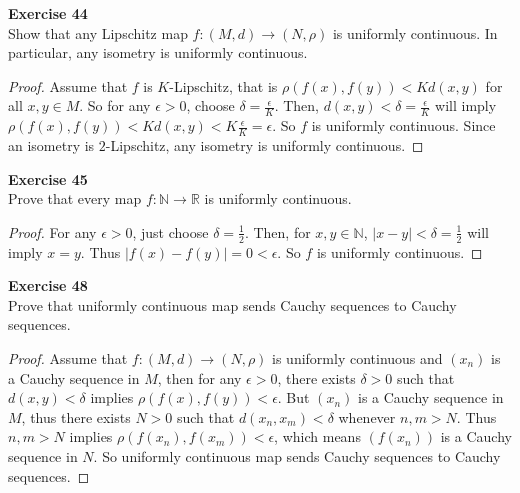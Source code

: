 \documentclass[12pt, a4paper]{article}
\theoremstyle{plain}
\newcommand{\N}{\mathbb{N}}
\newcommand{\R}{\mathbb{R}}
\newenvironment{exercise}[2][Exercise]
    { \begin{mdframed}[backgroundcolor=gray!20] \textbf{#1 #2} \\}
    {  \end{mdframed}}
\begin{document}
\begin{exercise}{44}
Show that any Lipschitz map $f:(M,d)\rightarrow (N,\rho)$ is uniformly continuous. In particular, any isometry is uniformly continuous.
\end{exercise}
	\begin{proof}
	Assume that $f$ is $K$-Lipschitz, that is $\rho(f(x),f(y))<Kd(x,y)$ for all $x,y\in M$. So for any $\epsilon>0$, choose $\delta =\frac{\epsilon}{K}$. Then, $d(x,y)<\delta = \frac{\epsilon}{K}$ will imply $\rho(f(x),f(y))<Kd(x,y)<K\frac{\epsilon}{K}=\epsilon$. So $f$ is uniformly continuous. Since an isometry is $2$-Lipschitz, any isometry is uniformly continuous.
	\end{proof}
	
\begin{exercise}{45}
Prove that every map $f:\N\rightarrow \R$ is uniformly continuous.
\end{exercise}
	\begin{proof}
	For any $\epsilon>0$, just choose $\delta=\frac{1}{2}$. Then, for $x,y\in\N$, $|x-y|<\delta =\frac{1}{2}$ will imply $x=y$. Thus $|f(x)-f(y)|=0<\epsilon$. So $f$ is uniformly continuous.
	\end{proof}

\pagebreak

\begin{exercise}{48}
Prove that uniformly continuous map sends Cauchy sequences to Cauchy sequences.
\end{exercise}
	\begin{proof}
	Assume that $f:(M,d)\rightarrow (N,\rho)$ is uniformly continuous and $(x_n)$ is a Cauchy sequence in $M$, then for any $\epsilon>0$, there exists $\delta >0$ such that $d(x,y)<\delta$ implies $\rho(f(x),f(y))<\epsilon$. But $(x_n)$ is a Cauchy sequence in $M$, thus there exists $N>0$ such that $d(x_n,x_m)<\delta$ whenever $n,m>N$. Thus $n,m>N$ implies $\rho(f(x_n),f(x_m))<\epsilon$, which means $(f(x_n))$ is a Cauchy sequence in $N$. So uniformly continuous map sends Cauchy sequences to Cauchy sequences.
	\end{proof}
	
\end{document}

